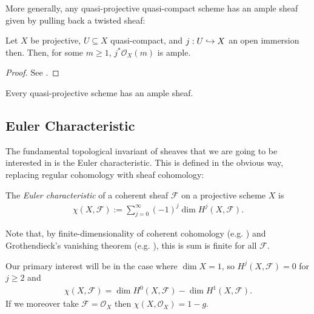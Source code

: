 \documentclass[12pt]{ociamthesis}  %
\begin{document}
More generally, any quasi-projective quasi-compact scheme has
an ample sheaf given by pulling back a twisted sheaf:

\begin{proposition}
  Let $X$ be projective, $U\subseteq X$ quasi-compact, and
  $j : U \hookrightarrow X$ an open immersion then. Then, for some $m\geq 1$,
  $j^*\mathscr O_X(m)$ is ample.
  \begin{proof}
    See \cite[\href{https://stacks.math.columbia.edu/tag/01Q2}{Tag 01Q2}]{stacks-project}.
  \end{proof}
\end{proposition}

\begin{corollary}
  Every quasi-projective scheme has an ample sheaf.
\end{corollary}


\subsection{Euler Characteristic}

The fundamental topological invariant of sheaves that we are going
to be interested in is the Euler characteristic. This is defined
in the obvious way, replacing regular cohomology with sheaf
cohomology:

\begin{definition}
  The \emph{Euler characteristic} of a coherent sheaf $\mathscr F$
  on a projective scheme $X$ is
  \begin{align*}
    \chi (X,\mathscr F) := \sum_{j=0}^\infty (-1)^j \dim H^j (X,\mathscr F).
  \end{align*}
\end{definition}

Note that, by finite-dimensionality of coherent cohomology
(e.g. \cite[\href{https://stacks.math.columbia.edu/tag/02O6}{Tag 02O6}]{stacks-project}) and Grothendieck's vanishing theorem (e.g.
\cite[III Theorem 2.7]{hartshorne1977}), this is sum is finite for
all $\mathscr F$.

\begin{example}
  Our primary interest will be in the case where
  $\dim X = 1$, so $H^j(X,\mathscr F)=0$ for $j\geq 2$ and
  \begin{align*}
    \chi (X,\mathscr F) = \dim H^0(X,\mathscr F)-\dim H^1(X,\mathscr F).
  \end{align*}
  If we moreover take $\mathscr F=\mathscr O_X$ then
  $\chi (X,\mathscr O_X) = 1 - g$. 
\end{example}
\end{document}
